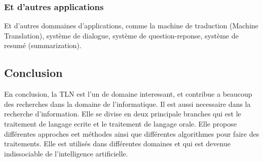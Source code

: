 \subsubsection*{Et d'autres applications}
Et d'autres dommaines d'applications, comme la machine de traduction (Machine Translation), système de dialogue, système de question-reponse, système de resumé (summarization).

\subsection{Conclusion}
En conclusion, la TLN est l'un de domaine interessant, et contribue a beaucoup des recherches dans la domaine de l'informatique. Il est aussi necessaire dans la recherche d'information. Elle se divise en deux principale branches qui est le traitement de langage ecrite et le traitement de langage orale. Elle propose différentes approches eet méthodes ainsi que différentes algorithmes pour faire des traitements. Elle est utilisés dans différentes domaines et qui est devenue indissociable de l'intelligence artificielle.